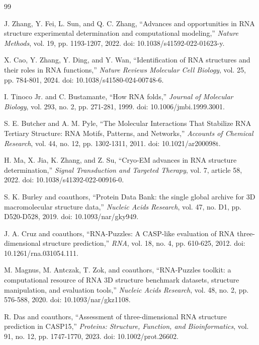 \begin{thebibliography}{99}

J. Zhang, Y. Fei, L. Sun, and Q. C. Zhang,
``Advances and opportunities in RNA structure experimental determination and computational modeling,''
\emph{Nature Methods}, vol. 19, pp. 1193-1207, 2022.
doi: 10.1038/s41592-022-01623-y.

X. Cao, Y. Zhang, Y. Ding, and Y. Wan,
``Identification of RNA structures and their roles in RNA functions,''
\emph{Nature Reviews Molecular Cell Biology}, vol. 25, pp. 784-801, 2024.
doi: 10.1038/s41580-024-00748-6.

I. Tinoco Jr. and C. Bustamante,
``How RNA folds,''
\emph{Journal of Molecular Biology}, vol. 293, no. 2, pp. 271-281, 1999.
doi: 10.1006/jmbi.1999.3001.

S. E. Butcher and A. M. Pyle,
``The Molecular Interactions That Stabilize RNA Tertiary Structure: RNA Motifs, Patterns, and Networks,''
\emph{Accounts of Chemical Research}, vol. 44, no. 12, pp. 1302-1311, 2011.
doi: 10.1021/ar200098t.

H. Ma, X. Jia, K. Zhang, and Z. Su,
``Cryo-EM advances in RNA structure determination,''
\emph{Signal Transduction and Targeted Therapy}, vol. 7, article 58, 2022.
doi: 10.1038/s41392-022-00916-0.

S. K. Burley and coauthors,
``Protein Data Bank: the single global archive for 3D macromolecular structure data,''
\emph{Nucleic Acids Research}, vol. 47, no. D1, pp. D520-D528, 2019.
doi: 10.1093/nar/gky949.

J. A. Cruz and coauthors,
``RNA-Puzzles: A CASP-like evaluation of RNA three-dimensional structure prediction,''
\emph{RNA}, vol. 18, no. 4, pp. 610-625, 2012.
doi: 10.1261/rna.031054.111.

M. Magnus, M. Antczak, T. Zok, and coauthors,
``RNA-Puzzles toolkit: a computational resource of RNA 3D structure benchmark datasets, structure manipulation, and evaluation tools,''
\emph{Nucleic Acids Research}, vol. 48, no. 2, pp. 576-588, 2020.
doi: 10.1093/nar/gkz1108.

R. Das and coauthors,
``Assessment of three-dimensional RNA structure prediction in CASP15,''
\emph{Proteins: Structure, Function, and Bioinformatics}, vol. 91, no. 12, pp. 1747-1770, 2023.
doi: 10.1002/prot.26602.


\end{thebibliography}
